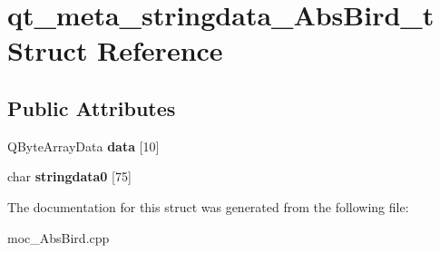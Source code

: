 \hypertarget{structqt__meta__stringdata__AbsBird__t}{}\section{qt\+\_\+meta\+\_\+stringdata\+\_\+\+Abs\+Bird\+\_\+t Struct Reference}
\label{structqt__meta__stringdata__AbsBird__t}
\subsection*{Public Attributes}
\begin{DoxyCompactItemize}
\item 
Q\+Byte\+Array\+Data {\bfseries data} \mbox{[}10\mbox{]}\hypertarget{structqt__meta__stringdata__AbsBird__t_ab292b9f61d163bc9a44fe38ac593e1a9}{}\label{structqt__meta__stringdata__AbsBird__t_ab292b9f61d163bc9a44fe38ac593e1a9}

\item 
char {\bfseries stringdata0} \mbox{[}75\mbox{]}\hypertarget{structqt__meta__stringdata__AbsBird__t_a6ad291a8804cc2be83dd2897537b708d}{}\label{structqt__meta__stringdata__AbsBird__t_a6ad291a8804cc2be83dd2897537b708d}

\end{DoxyCompactItemize}


The documentation for this struct was generated from the following file\+:\begin{DoxyCompactItemize}
\item 
moc\+\_\+\+Abs\+Bird.\+cpp\end{DoxyCompactItemize}
